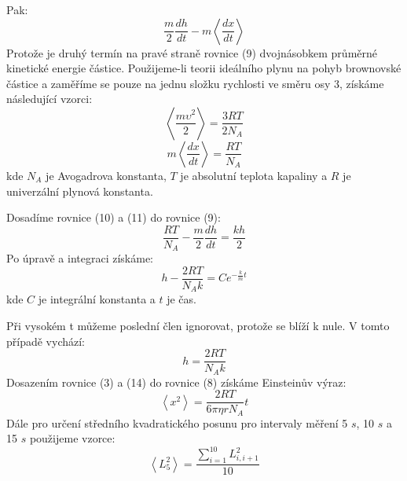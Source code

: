\documentclass[a4paper,11pt]{article}
\begin{document}
    \begin{minipage}[t]{0.5\textwidth} 
        Pak:
        \begin{equation}
            \frac{m}{2} \frac{dh}{dt} - m \left\langle\frac{dx}{dt}\right\rangle
        \end{equation}
        Protože je druhý termín na pravé straně rovnice (9) dvojnásobkem průměrné kinetické energie částice. Použijeme-li teorii ideálního plynu na pohyb brownovské částice a zaměříme se pouze na jednu složku rychlosti ve směru osy 3, získáme následující vzorci:
        \begin{equation}
            \left\langle\frac{m\upsilon^2}{2}\right\rangle = \frac{3RT}{2N_A}
        \end{equation}
        \begin{equation}
           m \left\langle\frac{dx}{dt}\right\rangle = \frac{RT}{N_A}
        \end{equation}
        kde $N_A$ je Avogadrova konstanta, $T$ je absolutní teplota kapaliny a $R$ je univerzální plynová konstanta. 
        \par Dosadíme rovnice (10) a (11) do rovnice (9): 
        \begin{equation}
             \frac{RT}{N_A} - \frac{m}{2} \frac{dh}{dt} = \frac{kh}{2}
        \end{equation}
        Po úpravě a integraci získáme: 
        \begin{equation}
            h - \frac{2RT}{N_Ak} = Ce^{-\frac{k}{m}t}
        \end{equation}
        kde $C$ je integrální konstanta a $t$ je čas.
        \par Při vysokém t můžeme poslední člen ignorovat, protože se blíží k nule. V tomto případě vychází: 
        \begin{equation}
            h = \frac{2RT}{N_Ak}
        \end{equation}
        Dosazením rovnice (3) a (14) do rovnice (8) získáme Einsteinův výraz:
        \begin{equation}
            \left\langle x^2 \right\rangle = \frac{2RT}{6 \pi \eta r N_A} t
        \end{equation}
        Dále pro určení středního kvadratického posunu pro intervaly měření 5 $s$, 10 $s$ a 15 $s$ použijeme vzorce: 
        \begin{equation}
            \left\langle L_5^2\right\rangle = \frac{\sum_{i=1}^{10} L_{i,i+1}^2}{10}
        \end{equation}
        \begin{equation}

\end{equation}
\end{minipage}
\end{document}
